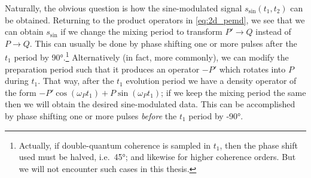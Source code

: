 Naturally, the obvious question is how the sine-modulated signal $s_\text{sin}(t_1, t_2)$ can be obtained.
Returning to the product operators in \cref{eq:2d_pemd}, we see that we can obtain $s_\text{sin}$ if we change the mixing period to transform $P' \to Q$ instead of $P \to Q$.
This can usually be done by phase shifting one or more pulses after the $t_1$ period by \ang{90}.\footnote{Actually, if double-quantum coherence is sampled in $t_1$, then the phase shift used must be halved, i.e.\ \ang{45}; and likewise for higher coherence orders. But we will not encounter such cases in this thesis.}
Alternatively (in fact, more commonly), we can modify the preparation period such that it produces an operator $-P'$ which rotates into $P$ during $t_1$.
That way, after the $t_1$ evolution period we have a density operator of the form $-P'\cos(\omega_P t_1) + P\sin(\omega_P t_1)$; if we keep the mixing period the same then we will obtain the desired sine-modulated data.
This can be accomplished by phase shifting one or more pulses \textit{before} the $t_1$ period by \ang{-90}.

